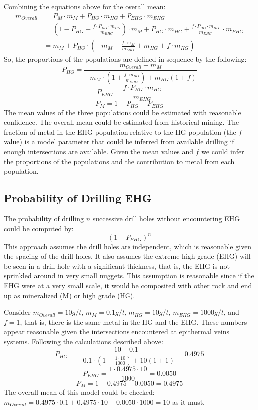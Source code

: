 Combining the equations above for the overall mean:
\begin{align}
m_{Overall} & = P_{M} \cdot m_{M}  + P_{HG} \cdot m_{HG} + P_{EHG} \cdot m_{EHG} \nonumber \\
& = \left(1-P_{HG}-\frac{f \cdot P_{HG} \cdot m_{HG}}{m_{EHG}}\right) \cdot m_{M} + P_{HG} \cdot m_{HG} + \frac{f \cdot P_{HG} \cdot m_{HG}}{m_{EHG}} \ \cdot m_{EHG} \nonumber \\
& = m_{M} + P_{HG} \cdot \left( -m_{M}-\frac{f \cdot m_{M}}{m_{EHG}}  + m_{HG} + f \cdot m_{HG} \right) \nonumber
\end{align}
So, the proportions of the populations are defined in sequence by the following:
\[
P_{HG} = 
\frac{m_{Overall} - m_M}
{
-m_M \cdot \left( 1+\frac{f \cdot m_{HG}}{m_{EHG}}\right) + m_{HG}(1+f)
}
\]
\[
P_{EHG} = \frac{f \cdot P_{HG} \cdot m_{HG}}{m_{EHG}}
\]
\[
P_{M} = 1 - P_{HG} - P_{EHG}
\]
The mean values of the three populations could be estimated with reasonable confidence. The overall mean could be estimated from historical mining. The fraction of metal in the EHG population relative to the HG population (the $f$ value) is a model parameter that could be inferred from available drilling if enough intersections are available. Given the mean values and $f$ we could infer the proportions of the populations and the contribution to metal from each population. 

\subsection{Probability of Drilling EHG}
\label{sec:prob}

The probability of drilling $n$ successive drill holes without encountering EHG could be computed by:
\[
\left( 1 - P_{EHG} \right)^n
\]
This approach assumes the drill holes are independent, which is reasonable given the spacing of the drill holes. It also assumes the extreme high grade (EHG) will be seen in a drill hole with a significant thickness, that is, the EHG is not sprinkled around in very small nuggets. This assumption is reasonable since if the EHG were at a very small scale, it would be composited with other rock and end up as mineralized (M) or high grade (HG).

Consider $m_{Overall} = 10 g/t$, $m_{M} = 0.1 g/t$, $m_{HG} = 10 g/t$, $m_{EHG} = 1000 g/t$, and $f=1$, that is, there is the same metal in the HG and the EHG.  These numbers appear reasonable given the intersections encountered at epithermal veins systems. Following the calculations described above:
\[
P_{HG} = 
\frac{10 - 0.1}
{
-0.1 \cdot \left( 1+\frac{1 \cdot 10}{1000}\right) + 10(1+1) 
}
= 0.4975
\]
\[
P_{EHG} = \frac{1 \cdot 0.4975 \cdot 10}{1000} = 0.0050
\]
\[
P_{M} = 1 - 0.4975 - 0.0050 = 0.4975
\]
The overall mean of this model could be checked: $m_{Overall} = 0.4975 \cdot 0.1 + 0.4975 \cdot 10 + 0.0050 \cdot 1000 = 10$ as it must.

